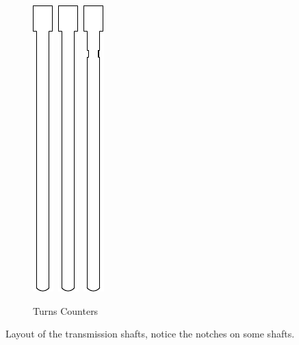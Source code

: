 \documentclass[openany]{book}
\begin{document}
\begin{figure}[!ht]
\begin{subfigure}{.4\textwidth}
		\includegraphics[width=.05\textwidth]{images/transmission-shaft.pdf}\,
		\includegraphics[width=.05\textwidth]{images/transmission-shaft.pdf}\, 
		\includegraphics[width=.05\textwidth]{images/transmission-turns-one.pdf}  
		\caption{Turns Counters}
	\end{subfigure}
	\caption{Layout of the transmission shafts, notice the notches on some shafts.}
	\label{fig:transmission:shafts}
\end{figure}
\end{document}
